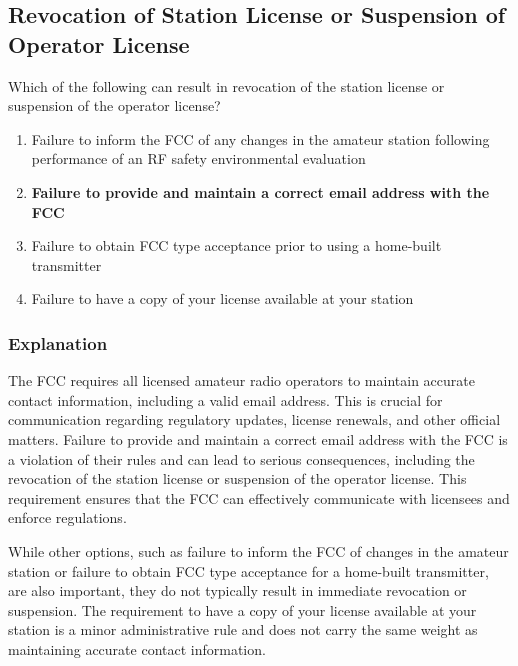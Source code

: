 \subsection{Revocation of Station License or Suspension of Operator License}\label{T1C07}

\begin{tcolorbox}[colback=gray!10!white,colframe=black!75!black,title=T1C07]
Which of the following can result in revocation of the station license or suspension of the operator license?
\begin{enumerate}[label=\Alph*]
    \item Failure to inform the FCC of any changes in the amateur station following performance of an RF safety environmental evaluation
    \item \textbf{Failure to provide and maintain a correct email address with the FCC}
    \item Failure to obtain FCC type acceptance prior to using a home-built transmitter
    \item Failure to have a copy of your license available at your station
\end{enumerate}
\end{tcolorbox}

\subsubsection{Explanation}
The FCC requires all licensed amateur radio operators to maintain accurate contact information, including a valid email address. This is crucial for communication regarding regulatory updates, license renewals, and other official matters. Failure to provide and maintain a correct email address with the FCC is a violation of their rules and can lead to serious consequences, including the revocation of the station license or suspension of the operator license. This requirement ensures that the FCC can effectively communicate with licensees and enforce regulations.

While other options, such as failure to inform the FCC of changes in the amateur station or failure to obtain FCC type acceptance for a home-built transmitter, are also important, they do not typically result in immediate revocation or suspension. The requirement to have a copy of your license available at your station is a minor administrative rule and does not carry the same weight as maintaining accurate contact information.

